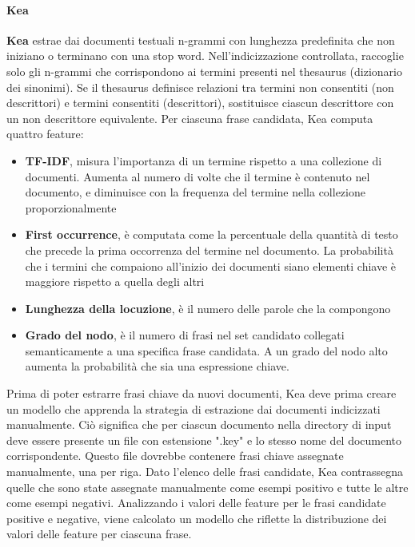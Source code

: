 \paragraph{Kea}
\textbf{Kea} estrae dai documenti testuali n-grammi con lunghezza predefinita che non iniziano o terminano con una stop word. Nell'indicizzazione controllata, raccoglie solo gli n-grammi che corrispondono ai termini presenti nel thesaurus (dizionario dei sinonimi). Se il thesaurus definisce relazioni tra termini non consentiti (non descrittori) e termini consentiti (descrittori), sostituisce ciascun descrittore con un non descrittore equivalente. Per ciascuna frase candidata, Kea computa quattro feature:
\begin{itemize}
\item{\textbf{TF-IDF}}, misura l'importanza di un termine rispetto a una collezione di documenti. Aumenta al numero di volte che il termine è contenuto nel documento, e diminuisce con la frequenza del termine nella collezione proporzionalmente
\item{\textbf{First occurrence}}, è computata come la percentuale della quantità di testo che precede la prima occorrenza del termine nel documento. La probabilità che i termini che compaiono all'inizio dei documenti siano elementi chiave è maggiore rispetto a quella degli altri
\item{\textbf{Lunghezza della locuzione}}, è il numero delle parole che la compongono
\item{\textbf{Grado del nodo}}, è il numero di frasi nel set candidato collegati semanticamente a una specifica frase candidata. A un grado del nodo alto aumenta la probabilità che sia una espressione chiave.
\end{itemize}

Prima di poter estrarre frasi chiave da nuovi documenti, Kea deve prima creare un modello che apprenda la strategia di estrazione dai documenti indicizzati manualmente. Ciò significa che per ciascun documento nella directory di input deve essere presente un file con estensione ".key" e lo stesso nome del documento corrispondente. Questo file dovrebbe contenere frasi chiave assegnate manualmente, una per riga.
Dato l'elenco delle frasi candidate, Kea contrassegna quelle che sono state assegnate manualmente come esempi positivo e tutte le altre come esempi negativi. Analizzando i valori delle feature per le frasi candidate positive e negative, viene calcolato un modello che riflette la distribuzione dei valori delle feature per ciascuna frase.

